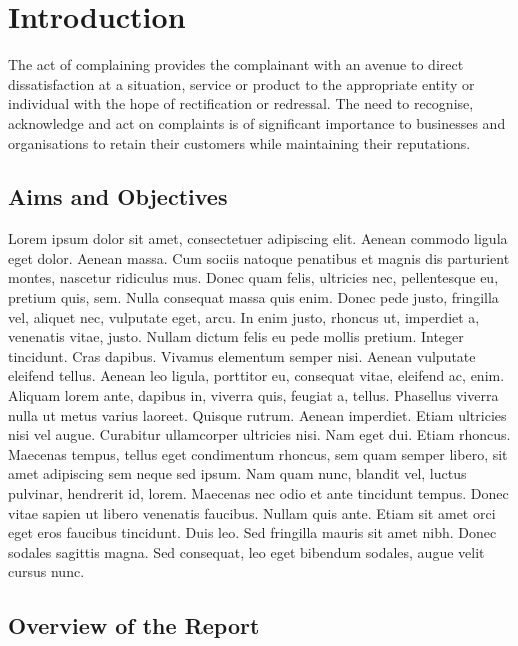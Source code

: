 \chapter{Introduction}

The act of complaining provides the complainant with an avenue to direct dissatisfaction at a situation, service or product to the appropriate entity or individual with the hope of rectification or redressal. The need to recognise, acknowledge and act on complaints is of significant importance to businesses and organisations to retain their customers while maintaining their reputations.

\section{Aims and Objectives}

Lorem ipsum dolor sit amet, consectetuer adipiscing elit. Aenean commodo ligula eget dolor. Aenean massa. Cum sociis natoque penatibus et magnis dis parturient montes, nascetur ridiculus mus. Donec quam felis, ultricies nec, pellentesque eu, pretium quis, sem. Nulla consequat massa quis enim. Donec pede justo, fringilla vel, aliquet nec, vulputate eget, arcu. In enim justo, rhoncus ut, imperdiet a, venenatis vitae, justo. Nullam dictum felis eu pede mollis pretium. Integer tincidunt. Cras dapibus. Vivamus elementum semper nisi. Aenean vulputate eleifend tellus. Aenean leo ligula, porttitor eu, consequat vitae, eleifend ac, enim. Aliquam lorem ante, dapibus in, viverra quis, feugiat a, tellus. Phasellus viverra nulla ut metus varius laoreet. Quisque rutrum. Aenean imperdiet. Etiam ultricies nisi vel augue. Curabitur ullamcorper ultricies nisi. Nam eget dui. Etiam rhoncus. Maecenas tempus, tellus eget condimentum rhoncus, sem quam semper libero, sit amet adipiscing sem neque sed ipsum. Nam quam nunc, blandit vel, luctus pulvinar, hendrerit id, lorem. Maecenas nec odio et ante tincidunt tempus. Donec vitae sapien ut libero venenatis faucibus. Nullam quis ante. Etiam sit amet orci eget eros faucibus tincidunt. Duis leo. Sed fringilla mauris sit amet nibh. Donec sodales sagittis magna. Sed consequat, leo eget bibendum sodales, augue velit cursus nunc.

\section{Overview of the Report}

